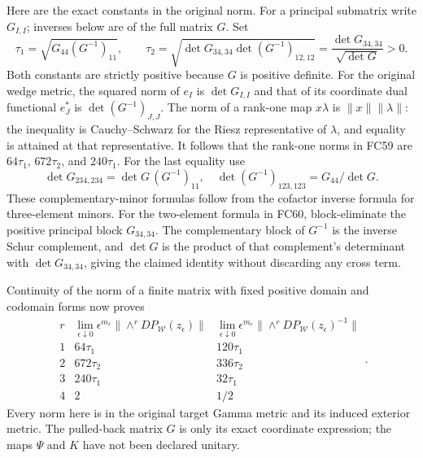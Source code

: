 Here are the exact constants in the original norm. For a principal
submatrix write $G_{I,I}$; inverses below are of the full matrix $G$.
Set
\[
 \tau_1=\sqrt{G_{44}(G^{-1})_{11}},\qquad
 \tau_2=\sqrt{\det G_{34,34}\det(G^{-1})_{12,12}}
       =\frac{\det G_{34,34}}{\sqrt{\det G}}>0.
 \tag{FC60}
\]
Both constants are strictly positive because $G$ is positive definite.
For the original wedge metric, the squared norm of $e_I$ is
$\det G_{I,I}$ and that of its coordinate dual functional $e_J^*$ is
$\det(G^{-1})_{J,J}$. The norm of a rank-one map $x\lambda$ is
$\|x\|\|\lambda\|$: the inequality is Cauchy--Schwarz for the
Riesz representative of $\lambda$, and equality is attained at that
representative. It follows that the rank-one norms in FC59 are
$64\tau_1$, $672\tau_2$, and $240\tau_1$.
For the last equality use
\[
 \det G_{234,234}=\det G\,(G^{-1})_{11},\quad
 \det(G^{-1})_{123,123}=G_{44}/\det G.
\]
These complementary-minor formulas follow from the cofactor inverse
formula for three-element minors. For the two-element formula in
FC60, block-eliminate the positive principal block $G_{34,34}$.
The complementary block of $G^{-1}$ is the inverse Schur complement,
and $\det G$ is the product of that complement's determinant with
$\det G_{34,34}$, giving the claimed identity without discarding
any cross term.

Continuity of the norm of a finite matrix with fixed positive domain
and codomain forms now proves
\[
\begin{array}{c|c|c}
r&\displaystyle\lim_{\epsilon\downarrow0}\epsilon^{m_r}
 \|\wedge^r DP_{\mathcal W}(z_\epsilon)\|&
\displaystyle\lim_{\epsilon\downarrow0}\epsilon^{m_r}
 \|\wedge^r DP_{\mathcal W}(z_\epsilon)^{-1}\|\\\hline
1&64\tau_1&120\tau_1\\
2&672\tau_2&336\tau_2\\
3&240\tau_1&32\tau_1\\
4&2&1/2
\end{array}.
\tag{FC61}
\]
Every norm here is in the original target Gamma metric and its induced
exterior metric. The pulled-back matrix $G$ is only its exact coordinate
expression; the maps $\Psi$ and $K$ have not been declared unitary.


